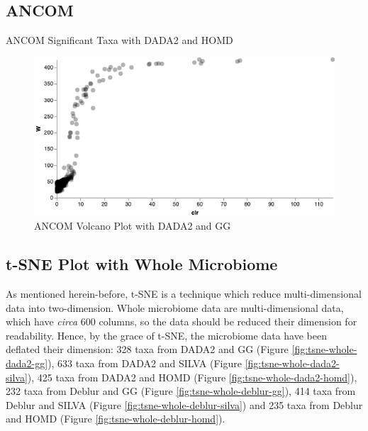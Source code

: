 \documentclass[a4paper]{article}
\begin{document}
        \subsection{ANCOM}

            \begin{table}[p]
                \centering
                \caption{ANCOM Significant Taxa with DADA2 and HOMD}
                \label{tb:ANCOM-dada2-gg}

            \end{table}

            \begin{figure}[p]
                \centering
                \includegraphics[width=0.8 \linewidth]{figures/ANCOM/DADA2.homd.png}
                \caption{ANCOM Volcano Plot with DADA2 and GG}
                \label{fig:volcano-dada2-gg}
            \end{figure}

        \subsection{t-SNE Plot with Whole Microbiome}
            As mentioned herein-before, t-SNE is a technique which reduce multi-dimensional data into two-dimension. Whole microbiome data are multi-dimensional data, which have \textit{circa} 600 columns, so the data should be reduced their dimension for readability. Hence, by the grace of t-SNE, the microbiome data have been deflated their dimension: 328 taxa from DADA2 and GG (Figure \ref{fig:tsne-whole-dada2-gg}), 633 taxa from DADA2 and SILVA (Figure \ref{fig:tsne-whole-dada2-silva}), 425 taxa from DADA2 and HOMD (Figure \ref{fig:tsne-whole-dada2-homd}), 232 taxa from Deblur and GG (Figure \ref{fig:tsne-whole-deblur-gg}), 414 taxa from Deblur and SILVA (Figure \ref{fig:tsne-whole-deblur-silva}) and 235 taxa from Deblur and HOMD (Figure \ref{fig:tsne-whole-deblur-homd}).
\end{document}
